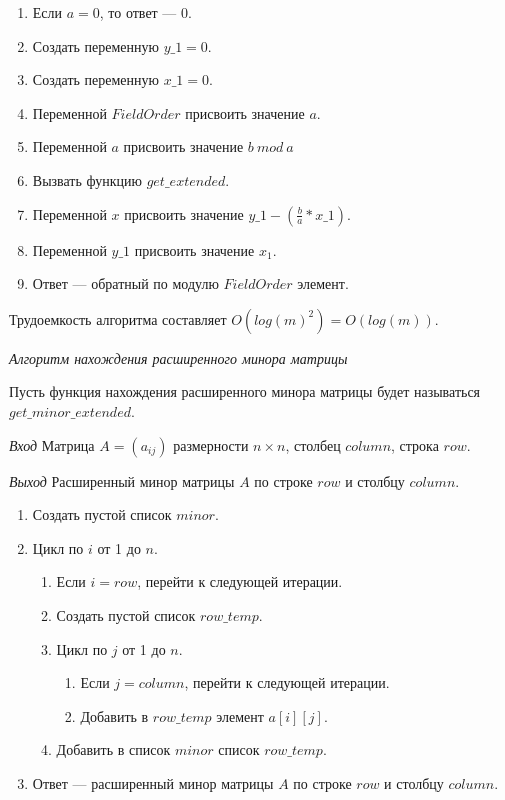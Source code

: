 \documentclass[bachelor, och, labwork]{shiza}
\begin{document}
\begin{enumerate}
    \item Если $a=0$, то ответ --- 0.
    \item Создать переменную $y\_1=0$.
    \item Создать переменную $x\_1=0$.
    \item Переменной $FieldOrder$ присвоить значение $a$.
    \item Переменной $a$ присвоить значение $b ~mod~ a$
    \item Вызвать функцию $get\_extended$.
    \item Переменной $x$ присвоить значение $y\_1 - (\frac{b}{a} * x\_1)$.
    \item Переменной $y\_1$ присвоить значение $x_1$.
    \item Ответ --- обратный по модулю $FieldOrder$ элемент.
\end{enumerate}

Трудоемкость алгоритма составляет $O(log(m)^2) = O(log(m))$.

\begin{center}
    \textit{Алгоритм нахождения расширенного минора матрицы}
\end{center}

Пусть функция нахождения расширенного минора матрицы будет называться $get\_minor\_extended$.

\textit{Вход} Матрица $A = (a_{ij})$ размерности $n \times n$, столбец $column$, 
строка $row$.

\textit{Выход} Расширенный минор матрицы $A$ по строке $row$ и столбцу $column$.

\begin{enumerate}
    \item Создать пустой список $minor$.
    \item Цикл по $i$ от 1 до $n$.
        \begin{enumerate}
            \item Если $i = row$, перейти к следующей итерации.
            \item Создать пустой список $row\_temp$.
            \item Цикл по $j$ от 1 до $n$.
                \begin{enumerate}
                    \item Если $j=column$, перейти к следующей итерации.
                    \item Добавить в $row\_temp$ элемент $a[i][j]$.
                \end{enumerate}
            \item Добавить в список $minor$ список $row\_temp$.
        \end{enumerate}
    \item Ответ --- расширенный минор матрицы $A$ по строке $row$ и столбцу $column$.
\end{enumerate}
\end{document}
